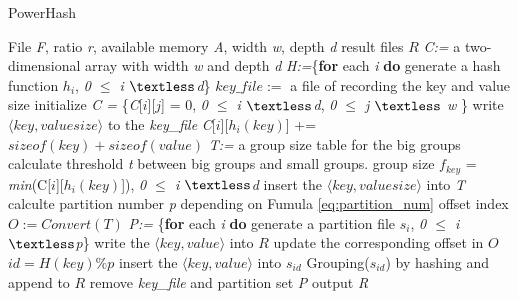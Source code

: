 \begin{algorithm}[ht]
    \caption{PowerHash}
  \label{alg:group}
    \begin{algorithmic}[1]
    \Require  File \emph{F}, ratio \emph{r}, available memory \emph{A}, width \emph{w}, depth \emph{d}
    \Ensure result files $R$
    \State \emph{C:=} a two-dimensional array with width \emph{w} and depth \emph{d}
    \State \emph{H:=}\{\textbf{for} each \emph{i} \textbf{do} generate a hash function $h_i$, \emph{0 $\le$ i $\textless$d}\}
    \State $key\_file :=$ a file of recording the key and value size
    \State initialize \emph{C = } \{\emph{C}[$i$][$j$] = 0, \emph{0 $\le$ i $\textless$d}, \emph{0 $\le$ j $\textless$ w} \}
    	\State write $\langle key,valuesize\rangle$ to the \emph{key\_file}
          \State \emph{C}[$i$][$h_{i}(key)$] += $sizeof(key) + sizeof(value)$
        \EndFor
    \EndFor
    \State \emph{T:=} a group size table for the big groups
    \State calculate threshold \emph{t} between big groups and small groups.
    	\State group size $f_{key}$ = \emph{min}(C[$i$][$h_{i}(key)$]), \emph{0 $\le$ i $\textless$d}
    		\State insert the $\langle key,valuesize\rangle$ into \emph{T}
    	\EndIf    	
    \EndFor
    \State calculte partition number \emph{p} depending on Fumula \ref{eq:partition_num}
    \State offset index $O:=Convert(T)$
    \State \emph{P:=} \{\textbf{for} each \emph{i} \textbf{do} generate a partition file $s_i$, \emph{0 $\le$ i $\textless$p}\}
    		\State write the $\langle key,value\rangle$ into $R$
    		\State update the corresponding offset in $O$
    	\Else
    		\State $id = H(key) \% p$
    		\State insert the $\langle key,value\rangle$ into $s_{id}$
    	\EndIf
    \EndFor
		\State Grouping($s_{id}$) by hashing and append to $R$
    \EndFor
    \State remove \emph{key\_file} and partition set \emph{P}
    \State output \emph{R}
    \end{algorithmic}
\end{algorithm}

